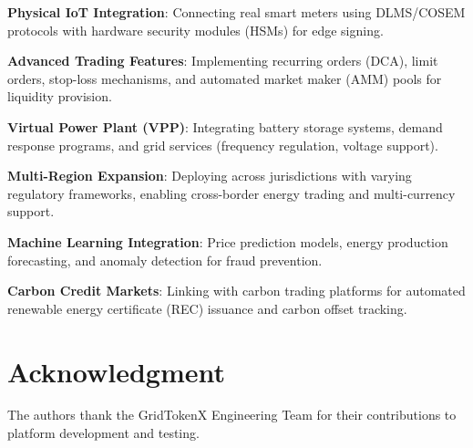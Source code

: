 \documentclass[conference]{IEEEtran}
\begin{document}
\textbf{Physical IoT Integration}: Connecting real smart meters using DLMS/COSEM protocols with hardware security modules (HSMs) for edge signing.

\textbf{Advanced Trading Features}: Implementing recurring orders (DCA), limit orders, stop-loss mechanisms, and automated market maker (AMM) pools for liquidity provision.

\textbf{Virtual Power Plant (VPP)}: Integrating battery storage systems, demand response programs, and grid services (frequency regulation, voltage support).

\textbf{Multi-Region Expansion}: Deploying across jurisdictions with varying regulatory frameworks, enabling cross-border energy trading and multi-currency support.

\textbf{Machine Learning Integration}: Price prediction models, energy production forecasting, and anomaly detection for fraud prevention.

\textbf{Carbon Credit Markets}: Linking with carbon trading platforms for automated renewable energy certificate (REC) issuance and carbon offset tracking.

\section*{Acknowledgment}

The authors thank the GridTokenX Engineering Team for their contributions to platform development and testing.



\end{document}
